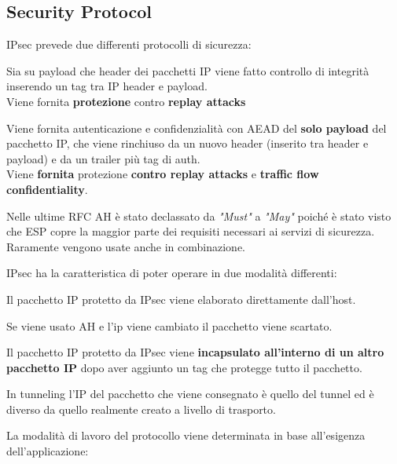\subsection{Security Protocol}
IPsec prevede due differenti protocolli di sicurezza:
\begin{definition}\label{def:ah}
Sia su payload che header dei pacchetti IP viene fatto controllo di integrità inserendo un tag tra IP header e payload. \\
Viene fornita \textbf{protezione} contro \textbf{replay attacks}
\end{definition}
\begin{definition}
Viene fornita autenticazione e confidenzialità con AEAD del \textbf{solo payload} del pacchetto IP, che viene rinchiuso da un nuovo header (inserito tra header e payload) e da un trailer più tag di auth.\\
Viene \textbf{fornita} protezione \textbf{contro replay attacks} e \textbf{traffic flow confidentiality}.
\end{definition}
\begin{remark}
Nelle ultime RFC AH è stato declassato da \textit{"Must"} a \textit{"May"} poiché è stato visto che ESP copre la maggior parte dei requisiti necessari ai servizi di sicurezza. Raramente vengono usate anche in combinazione.
\end{remark}
IPsec ha la caratteristica di poter operare in due modalità differenti:
\begin{definition}\label{def:transport}
Il pacchetto IP protetto da IPsec viene elaborato direttamente dall'host.\\
\begin{remark}
Se viene usato AH e l'ip viene cambiato il pacchetto viene scartato.
\end{remark}
\end{definition}
\begin{definition}\label{def:tunnel}
Il pacchetto IP protetto da IPsec viene \textbf{incapsulato all'interno di un altro pacchetto IP} dopo aver aggiunto un tag che protegge tutto il pacchetto.\\
\begin{remark}
In tunneling l'IP del pacchetto che viene consegnato è quello del tunnel ed è diverso da quello realmente creato a livello di trasporto.
\end{remark}
\end{definition}
La modalità di lavoro del protocollo viene determinata in base all'esigenza dell'applicazione:
